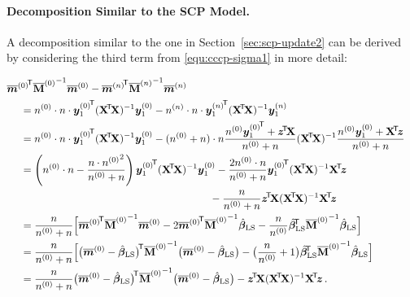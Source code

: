 \paragraph{Decomposition Similar to the SCP Model.}


A decomposition similar to the one in Section~\ref{sec:scp-update2} can be derived
by considering the third term from \eqref{equ:cccp-sigma1} in more detail:

\begin{align*}
\lefteqn{
    {\tmz}^\tra {\tMz}^{-1} \tmz
  - {\tmn}^\tra {\tMn}^{-1} \tmn } \hspace*{3ex} \\
 &= \nz \cdot n \cdot {\byz_1}^\tra (\XtX)^{-1} \byz_1
  - \nn \cdot n \cdot {\byn_1}^\tra (\XtX)^{-1} \byn_1 \\
 &= \nz \cdot n \cdot {\byz_1}^\tra (\XtX)^{-1} \byz_1
  - (\nz + n) \cdot n \frac{\nz {\byz_1}^\tra + \ztX}{\nz + n} (\XtX)^{-1} \frac{\nz \byz_1 + \Xtz}{\nz + n} \\
 &= \left(\nz \cdot n - \frac{n \cdot {\nz}^2}{\nz + n}\right) {\byz_1}^\tra (\XtX)^{-1} \byz_1
  - \frac{2\nz \cdot n}{\nz + n}                               {\byz_1}^\tra (\XtX)^{-1} \Xtz \\ & \hspace*{42ex}
  - \frac{n}{\nz + n}                                                   \ztX (\XtX)^{-1} \Xtz \\
 &= \frac{n}{\nz + n} \Big[               {\tmz}^\tra {\tMz}^{-1} \tmz
                           - 2            {\tmz}^\tra {\tMz}^{-1} \bls
                           -\frac{n}{\nz} {\bls}^\tra {\tMz}^{-1} \bls \Big] \\
 &= \frac{n}{\nz + n} \Big[ \big(\tmz - \bls\big)^\tra {\tMz}^{-1} \big(\tmz - \bls\big)
                           -\big(\frac{n}{\nz}+1\big)  {\bls}^\tra {\tMz}^{-1} \bls \Big] \\
 &= \frac{n}{\nz + n}       \big(\tmz - \bls\big)^\tra {\tMz}^{-1} \big(\tmz - \bls\big)
                           - \ztX (\XtX)^{-1} \Xtz\,.
\end{align*}

